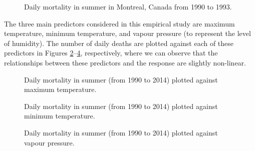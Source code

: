 \documentclass[
  11pt,
  a4paper,
]{article}
\begin{document}
\begin{figure}


\caption{\label{fig-deaths}Daily mortality in summer in Montreal, Canada
from 1990 to 1993.}

\end{figure}%

The three main predictors considered in this empirical study are maximum
temperature, minimum temperature, and vapour pressure (to represent the
level of humidity). The number of daily deaths are plotted against each
of these predictors in Figures \ref{fig-Tmax}--\ref{fig-Vp},
respectively, where we can observe that the relationships between these
predictors and the response are slightly non-linear.

\begin{figure}


\caption{\label{fig-Tmax}Daily mortality in summer (from 1990 to 2014)
plotted against maximum temperature.}

\end{figure}%

\begin{figure}


\caption{\label{fig-Tmin}Daily mortality in summer (from 1990 to 2014)
plotted against minimum temperature.}

\end{figure}%

\begin{figure}


\caption{\label{fig-Vp}Daily mortality in summer (from 1990 to 2014)
plotted against vapour pressure.}

\end{figure}%

\pagebreak[3]
\end{document}
